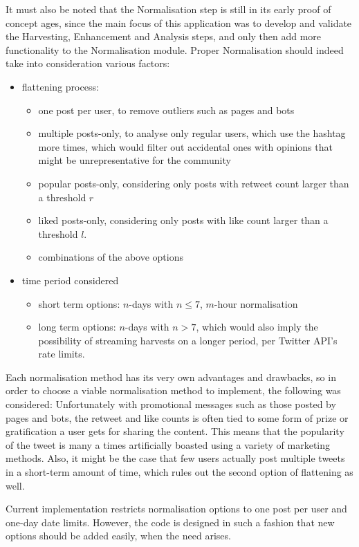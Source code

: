 \documentclass[12pt,a4paper,twoside]{report}
\begin{document}
It must also be noted that the Normalisation step is still in its early proof of concept ages, since the main focus of this application was to develop and validate the Harvesting, Enhancement and Analysis steps, and only then add more functionality to the Normalisation module. Proper Normalisation should indeed take into consideration various factors:

\begin{itemize}
\item flattening process: 
\begin{itemize}
\item one post per user, to remove outliers such as pages and bots
\item multiple posts-only, to analyse only regular users, which use the hashtag more times, which would filter out accidental ones with opinions that might be unrepresentative for the community
\item popular posts-only, considering only posts with retweet count larger than a threshold $r$
\item liked posts-only, considering only posts with like count larger than a threshold $l$.
\item combinations of the above options
\end{itemize}
\item time period considered
\begin{itemize}
\item short term options: $n$-days with $n\leq7$, $m$-hour normalisation
\item long term options: $n$-days with $n>7$, which would also imply the possibility of streaming harvests on a longer period, per Twitter API's rate limits.
\end{itemize} 
\end{itemize}

Each normalisation method has its very own advantages and drawbacks, so in order to choose a viable normalisation method to implement, the following was considered: Unfortunately with promotional messages such as those posted by pages and bots, the retweet and like counts is often tied to some form of prize or gratification a user gets for sharing the content. This means that the popularity of the tweet is many a times artificially boasted using a variety of marketing methods. Also, it might be the case that few users actually post multiple tweets in a short-term amount of time, which rules out the second option of flattening as well.

Current implementation restricts normalisation options to one post per user and one-day date limits. However, the code is designed in such a fashion that new options should be added easily, when the need arises.
\end{document}
